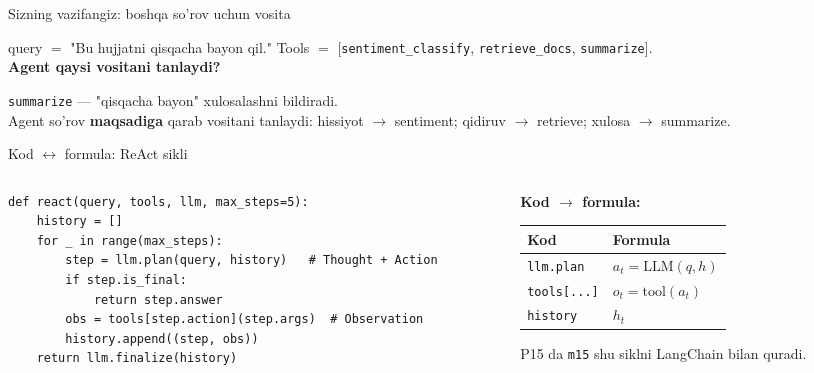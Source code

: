 \documentclass[aspectratio=169,11pt]{beamer}
\begin{document}
\begin{frame}{Sizning vazifangiz: boshqa so'rov uchun vosita}
  \begin{tcolorbox}[warnbox,title=Savol --- 60 soniya]
    \small
    query $=$ "Bu hujjatni qisqacha bayon qil." \;
    Tools $=$ [\texttt{sentiment\_classify}, \texttt{retrieve\_docs}, \texttt{summarize}].\\[4pt]
    \textbf{Agent qaysi vositani tanlaydi?}
  \end{tcolorbox}
  \pause
  \begin{tcolorbox}[okbox,title=Javob]
    \small
    \texttt{summarize} --- "qisqacha bayon" xulosalashni bildiradi.\\[3pt]
    \footnotesize Agent so'rov \textbf{maqsadiga} qarab vositani tanlaydi:
    hissiyot $\to$ sentiment; qidiruv $\to$ retrieve; xulosa $\to$ summarize.
  \end{tcolorbox}
\end{frame}

\begin{frame}[fragile]{Kod $\leftrightarrow$ formula: ReAct sikli}
  \begin{columns}[T]
    \begin{column}{0.58\textwidth}
\begin{lstlisting}
def react(query, tools, llm, max_steps=5):
    history = []
    for _ in range(max_steps):
        step = llm.plan(query, history)   # Thought + Action
        if step.is_final:
            return step.answer
        obs = tools[step.action](step.args)  # Observation
        history.append((step, obs))
    return llm.finalize(history)
\end{lstlisting}
    \end{column}
    \begin{column}{0.38\textwidth}
      \textbf{Kod $\to$ formula:}\\[3pt]
      \footnotesize
      \begin{tabular}{p{1.7cm}p{2.0cm}}
        \toprule
        Kod & Formula \\
        \midrule
        \texttt{llm.plan} & $a_t=\mathrm{LLM}(q,h)$ \\
        \texttt{tools[...]} & $o_t=\mathrm{tool}(a_t)$ \\
        \texttt{history} & $h_t$ \\
        \bottomrule
      \end{tabular}
      \vspace{4pt}
      \begin{tcolorbox}[okbox,top=2pt,bottom=2pt]
        \footnotesize
        P15 da \texttt{m15} shu siklni LangChain bilan quradi.
      \end{tcolorbox}
    \end{column}
  \end{columns}
\end{frame}
\end{document}

